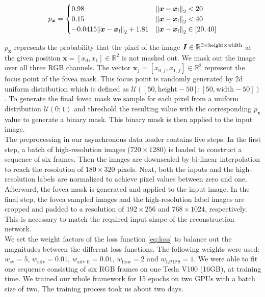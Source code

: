 \documentclass[10pt,twocolumn,letterpaper]{article}
\newcommand{\Vector}[1]{\boldsymbol{#1}}
\newcommand{\Matrix}[1]{\boldsymbol{\MakeUppercase{#1}}}
\newcommand{\Set}[1]{\mathbb{#1}}
\begin{document}
\begin{equation}
    p_{\Vector{x}} = \begin{cases} 0.98 & \norm{\Vector{x} - \Vector{x}_{\text{f}}}_{2} < 20\\
     0.15 & \norm{\Vector{x} - \Vector{x}_{\text{f}}}_{2} < 40\\
     -0.0415 \norm{\Vector{x} - \Vector{x}_{\text{f}}}_{2} + 1.81 & \norm{\Vector{x} - \Vector{x}_{\text{f}}}_{2} \in \left[20, 40\right]
    \end{cases}
\end{equation}

$p_{\Vector{x}}$ represents the probability that the pixel of the image $\Matrix{I}\in\Set{R}^{3\times\text{height}\times\text{width}}$ at the given position $\Vector{x}=[x_{0}, x_{1}]\in\Set{R}^2$ is not masked out. We mask out the image over all three RGB channels. The vector $\Vector{x}_{f}=[x_{0,f}, x_{1,f}]\in\Set{R}^2$ represent the focus point of the fovea mask. This focus point is randomly generated by 2d uniform distribution which is defined as $\mathcal{U}\left(\left[50, \text{height} - 50\right]; \left[50, \text{width} - 50\right]\right)$. To generate the final fovea mask we sample for each pixel from a uniform distribution $\mathcal{U}\left(0; 1\right)$ and threshold the resulting value with the corresponding $p_{\Vector{x}}$ value to generate a binary mask. This binary mask is then applied to the input image.\\
The preprocessing in our asynchronous data loader contains five steps. In the first step, a batch of high-resolution images ($720 \times 1280$) is loaded to construct a sequence of six frames. Then the images are downscaled by bi-linear interpolation to reach the resolution of $180 \times 320$ pixels. Next, both the inputs and the high-resolution labels are normalized to achieve pixel values between zero and one. Afterward, the fovea mask is generated and applied to the input image. In the final step, the fovea sampled images and the high-resolution label images are cropped and padded to a resolution of $192 \times 256$ and $768 \times 1024$, respectively. This is necessary to match the required input shape of the reconstruction network.\\
We set the weight factors of the loss function \ref{eq:loss} to balance out the magnitudes between the different loss functions. The following weights were used: $w_{\text{sv}}=5$, $w_{\text{adv}}=0.01$, $w_{\text{adv ff}}=0.01$, $w_{\text{flow}}=2$ and $w_{\text{LPIPS}}=1$.
We were able to fit one sequence consisting of six RGB frames on one Tesla V100 (16GB), at training time. We trained our whole framework for 15 epochs on two GPUs with a batch size of two. The training process took us about two days.
\end{document}
